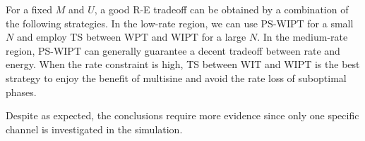 For a fixed $M$ and $U$, a good R-E tradeoff can be obtained by a combination of the following strategies. In the low-rate region, we can use PS-WIPT for a small $N$ and employ TS between WPT and WIPT for a large $N$. In the medium-rate region, PS-WIPT can generally guarantee a decent tradeoff between rate and energy. When the rate constraint is high, TS between WIT and WIPT is the best strategy to enjoy the benefit of multisine and avoid the rate loss of suboptimal phases.

Despite as expected, the conclusions require more evidence since only one specific channel is investigated in the simulation. 